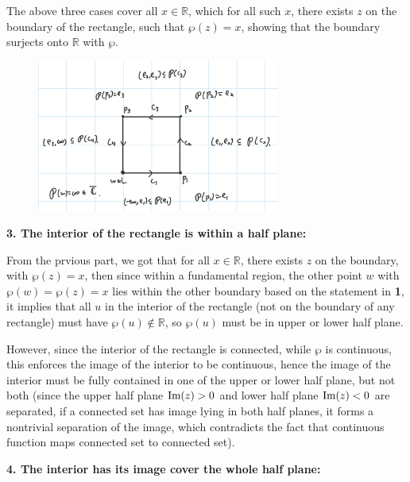 \documentclass{article}
\begin{document}
\begin{itemize}
    The above three cases cover all $x\in\mathbb{R}$, which for all such $x$, there exists $z$ on the boundary of the rectangle, such that $\wp(z)=x$, showing that the boundary surjects onto $\mathbb{R}$ with $\wp$.

    \begin{figure}[h!]
        \begin{center}
            \includegraphics*[width=80mm]{image 3.jpg}
        \end{center}
    \end{figure}

    \hfil

    \textbf{3. The interior of the rectangle is within a half plane:}

    From the prvious part, we got that for all $x\in \mathbb{R}$, there exists $z$ on the boundary, with $\wp(z)=x$, then since within a fundamental region, the other point $w$ with $\wp(w)=\wp(z)=x$ lies within the other boundary based on the statement in \textbf{1}, it implies that all $u$ in the interior of the rectangle (not on the boundary of any rectangle) must have $\wp(u)\notin \mathbb{R}$, so $\wp(u)$ must be in upper or lower half plane.

    However, since the interior of the rectangle is connected, while $\wp$ is continuous, this enforces the image of the interior to be continuous, hence the image of the interior must be fully contained in one of the upper or lower half plane, but not both (since the upper half plane $\textmd{Im}(z)>0$ and lower half plane $\textmd{Im}(z)<0$ are separated, if a connected set has image lying in both half planes, it forms a nontrivial separation of the image, which contradicts the fact that continuous function maps connected set to connected set).

    \hfil

    \textbf{4. The interior has its image cover the whole half plane:}


\end{itemize}
\end{document}
